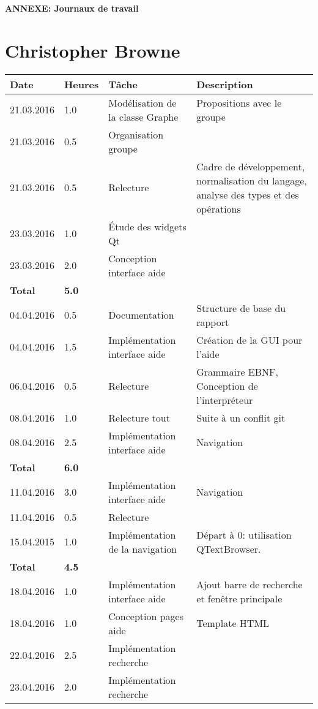 \documentclass[french]{article}
\begin{document}
	\centering
	\large{\textbf{ANNEXE: Journaux de travail}}
	
	\justify
	
	\section*{Christopher Browne}
	\begin{longtable}{p{}|p{}|p{}|p{}}
		Date&Heures&Tâche&Description\\
		\hline \hline
		21.03.2016 & 1.0 & Modélisation de la classe Graphe & Propositions avec le groupe \\
		21.03.2016 & 0.5 & Organisation groupe & \\
		21.03.2016 & 0.5 & Relecture & Cadre de développement, normalisation du langage, analyse des types et des opérations \\
		23.03.2016 & 1.0 & Étude des widgets Qt & \\
		23.03.2016 & 2.0 & Conception interface aide & \\
		\textbf{Total} & \textbf{5.0} &&\\
		\hline
		04.04.2016 & 0.5 & Documentation & Structure de base du rapport \\
		04.04.2016 & 1.5 & Implémentation interface aide & Création de la GUI pour l'aide \\
		06.04.2016 & 0.5 & Relecture & Grammaire EBNF, Conception de l'interpréteur\\
		08.04.2016 & 1.0 & Relecture tout & Suite à un conflit git\\
		08.04.2016 & 2.5 & Implémentation interface aide & Navigation \\
		\textbf{Total} & \textbf{6.0} &&\\
		\hline
		11.04.2016 & 3.0 & Implémentation interface aide & Navigation \\
		11.04.2016 & 0.5 & Relecture & \\
		15.04.2015 & 1.0 & Implémentation de la navigation & Départ à 0: utilisation QTextBrowser.\\
		\textbf{Total} & \textbf{4.5} &&\\
		\hline
		18.04.2016 & 1.0 & Implémentation interface aide & Ajout barre de recherche et fenêtre principale \\
		18.04.2016 & 1.0 & Conception pages aide & Template HTML\\
		22.04.2016 & 2.5 & Implémentation recherche & \\
		23.04.2016 & 2.0 & Implémentation recherche & \\

\end{longtable}
\end{document}

